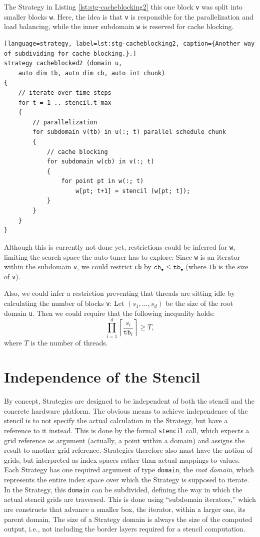 The Strategy in Listing \ref{lst:stg-cacheblocking2} this one block \texttt{v} was split into smaller blocks
\texttt{w}. Here, the idea is that \texttt{v} is responsible for the parallelization and load balancing,
while the inner subdomain \texttt{w} is reserved for cache blocking.

\begin{lstlisting}[language=strategy, label=lst:stg-cacheblocking2, caption={Another way of subdividing for cache blocking.}.]
strategy cacheblocked2 (domain u,
	auto dim tb, auto dim cb, auto int chunk)
{
	// iterate over time steps 
	for t = 1 .. stencil.t_max
	{
		// parallelization
		for subdomain v(tb) in u(:; t) parallel schedule chunk
		{
			// cache blocking
			for subdomain w(cb) in v(:; t)
			{
				for point pt in w(:; t)
					w[pt; t+1] = stencil (w[pt; t]);
			}
		}
	}
}
\end{lstlisting}

Although this is currently not done yet, restrictions could be inferred for \texttt{w}, limiting the search space
the auto-tuner has to explore: Since \texttt{w} is an iterator within the subdomain \texttt{v}, we could restrict
\texttt{cb} by $\mathtt{cb}_{\bullet} \leq \mathtt{tb}_{\bullet}$ (where \texttt{tb} is the size of \texttt{v}).

Also, we could infer a restriction preventing that threads are sitting idle by calculating the number of blocks \texttt{v}:
Let $(s_1, \dots, s_d)$ be the size of the root domain \texttt{u}. Then we could require that the following inequality holds:
\[
	\prod_{i=1}^d \left\lceil \frac{s_i}{\mathtt{tb}_i} \right\rceil \geq T,
\]
where $T$ is the number of threads.


\section{Independence of the Stencil}

By concept, Strategies are designed to be independent of both the stencil and the concrete hardware platform.
The obvious means to achieve independence of the stencil is to not specify the actual calculation in the Strategy,
but have a reference to it instead. This is done by the formal \texttt{stencil} call, which expects a grid reference
as argument (actually, a point within a domain) and assigns the result to another grid reference.
Strategies therefore also must have the notion of grids, but interpreted as index spaces rather than actual
mappings to values. Each Strategy has one required argument of type \texttt{domain}, the {\em root domain}, which represents the entire
index space over which the Strategy is supposed to iterate. In the Strategy, this \texttt{domain} can be subdivided,
defining the way in which the actual stencil grids are traversed. This is done using ``subdomain iterators,'' which
are constructs that advance a smaller box, the iterator, within a larger one, its parent domain.
The size of a Strategy domain is always the size of the computed output, i.e., not including the border layers required
for a stencil computation.


